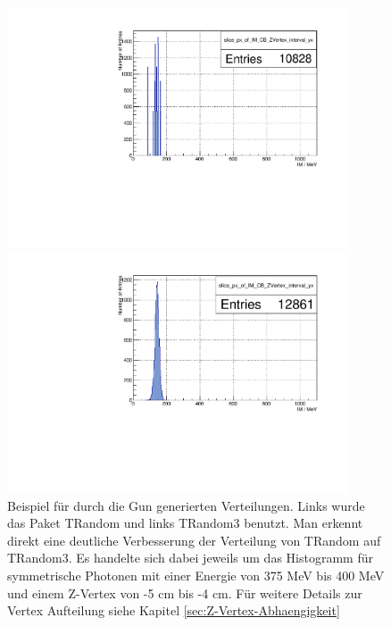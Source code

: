 \documentclass[a4paper,11pt,oneside,final,german,openbib,pdftex]{scrbook}
\begin{document}
{\begin{figure}[h!]
	\centering
	\begin{minipage}{0.45\textwidth}
		\centering
		\includegraphics[width=0.9\textwidth]{20171104BadRandomGenerator}
	\end{minipage}
	\hfill
	\begin{minipage}{0.45\textwidth}
		\centering
		\includegraphics[width=0.9\textwidth]{20171204GoodRandomGenerator}
	\end{minipage}
	\caption[Beispiel f\"ur die Verteilung durch Zufallsgeneratoren]{Beispiel f\"ur durch die Gun generierten Verteilungen. Links wurde das Paket TRandom und links TRandom3 benutzt. Man erkennt direkt eine deutliche Verbesserung der Verteilung von TRandom auf TRandom3. Es handelte sich dabei jeweils um das Histogramm f\"ur symmetrische Photonen mit einer Energie von 375 MeV bis 400 MeV und einem Z-Vertex von -5 cm bis -4 cm. F\"ur weitere Details zur Vertex Aufteilung siehe Kapitel \ref{sec:Z-Vertex-Abhaengigkeit}}
	\label{fig:Random-Verteilung}
\end{figure}



}
\end{document}
